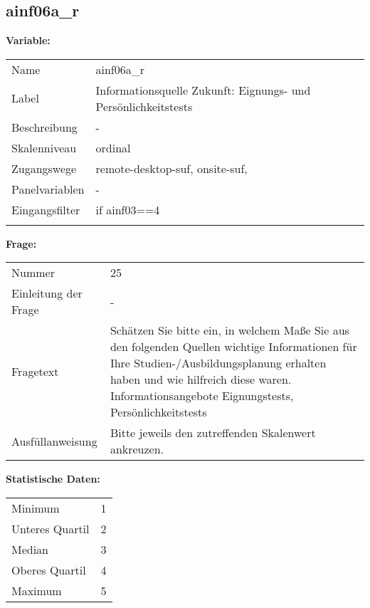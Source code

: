 	
	
	\subsection{ainf06a\_r}
	\label{subSection:ainf06a_r}

	\noindent\textbf{Variable:}\\
		\begin{tabular}{lL{11.3cm}}
			\label{tableVariable:ainf06a_r}
			Name & ainf06a\_r \\
			Label & Informationsquelle Zukunft: Eignungs- und Persönlichkeitstests \\
			Beschreibung & - \\
			Skalenniveau & ordinal \\
			Zugangswege &
				remote-desktop-suf,
				onsite-suf,
 \\
			Panelvariablen & -
			 \\
			Eingangsfilter & if ainf03==4 \\
 \\
		\end{tabular}

		\vspace*{1 cm}
		\noindent\textbf{Frage:}\\
		\begin{tabular}{lL{11.3cm}}
			\label{tableQuestion:ainf06a_r}
			Nummer & 25 \\
			Einleitung der Frage & - \\
			Fragetext & Schätzen Sie bitte ein, in welchem Maße Sie aus den folgenden Quellen wichtige Informationen für Ihre Studien-/Ausbildungsplanung erhalten haben und wie hilfreich diese waren.
Informationsangebote
Eignungstests, Persönlichkeitstests \\
			Ausfüllanweisung & Bitte jeweils den zutreffenden Skalenwert ankreuzen. \\
		\end{tabular}


		\vspace*{1 cm}
		\noindent\textbf{Statistische Daten:}\\
			\begin{tabular}{ll}
				\label{tableStatistics:ainf06a_r}
					Minimum & 1 \\
					Unteres Quartil & 2 \\
					Median & 3 \\
					Oberes Quartil & 4 \\
					Maximum & 5 \\
			\end{tabular}




